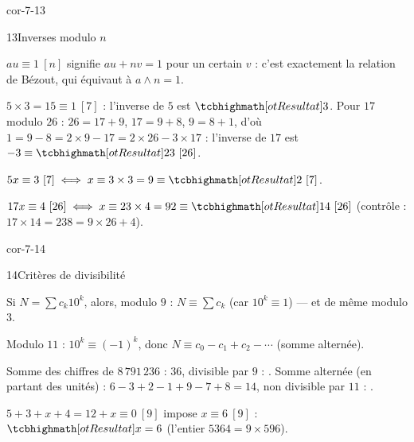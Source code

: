\begin{blocLivre}{cor-7-13}
\begin{corrige}{13}{Inverses modulo $n$}
\begin{questions}
  \item $au\equiv1\ [n]$ signifie $au+nv=1$ pour un certain $v$ : c'est
    exactement la relation de Bézout, qui équivaut à $a\wedge n=1$.
  \item $5\times3=15\equiv1\ [7]$ : l'inverse de $5$ est $\res{3}$.
    Pour $17$ modulo $26$ : $26=17+9$, $17=9+8$, $9=8+1$, d'où
    $1=9-8=2\times9-17=2\times26-3\times17$ : l'inverse de $17$ est
    $-3\equiv\res{23}\ [26]$.
  \item $5x\equiv3\ [7]\iff x\equiv3\times3=9\equiv\res{2}\ [7]$.
  \item $17x\equiv4\ [26]\iff x\equiv23\times4=92\equiv\res{14}\ [26]$
    (contrôle : $17\times14=238=9\times26+4$).
\end{questions}
\end{corrige}
\end{blocLivre}

\begin{blocLivre}{cor-7-14}
\begin{corrige}{14}{Critères de divisibilité}
\begin{questions}
  \item Si $N=\sum c_k10^{k}$, alors, modulo $9$ :
    $N\equiv\sum c_k$ (car $10^{k}\equiv1$) — et de même modulo $3$.
  \item Modulo $11$ : $10^{k}\equiv(-1)^{k}$, donc
    $N\equiv c_0-c_1+c_2-\cdots$ (somme alternée).
  \item Somme des chiffres de $8\,791\,236$ : $36$, divisible par $9$ :
    . Somme alternée (en partant des unités) :
    $6-3+2-1+9-7+8=14$, non divisible par $11$ :
    .
  \item $5+3+x+4=12+x\equiv0\ [9]$ impose $x\equiv6\ [9]$ :
    $\res{x=6}$ (l'entier $5364=9\times596$).
\end{questions}
\end{corrige}
\end{blocLivre}

